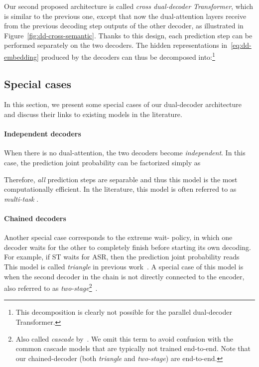 \documentclass[11pt]{article}
\theoremstyle{plain}
\theoremstyle{definition}
\begin{document}
Our second proposed architecture is called \emph{cross dual-decoder Transformer}, which is similar to the previous one, except that now the dual-attention layers receive  from the previous decoding step outputs of the other decoder, as illustrated in Figure~\ref{fig:dd-cross-semantic}. Thanks to this design, each prediction step can be performed separately on the two decoders. The hidden representations  in~\eqref{eq:dd-embedding} produced by the decoders can thus be decomposed into:\footnote{This decomposition is clearly not possible for the parallel dual-decoder Transformer.}


\subsection{Special cases}
\label{sec:degenerate-cases}

In this section, we present some special cases of our dual-decoder architecture and discuss their links to existing models in the literature.

\paragraph{Independent decoders}
When there is no dual-attention, the two decoders become \emph{independent}. In this case, the prediction joint probability can be factorized simply as

Therefore, \emph{all} prediction steps are separable and thus this model is the most computationally efficient. In the literature, this model is often referred to as \emph{multi-task} \cite{anastasopoulos2018tied,sperber2020consistent}.

\paragraph{Chained decoders}
Another special case corresponds to the extreme wait- policy, in which one decoder waits for the other to completely finish before starting its own decoding. For example, if ST waits for ASR, then the prediction joint probability reads  
This model is called \emph{triangle} in previous work~\cite{anastasopoulos2018tied,sperber2020consistent}. A special case of this model is when the second decoder in the chain is not directly connected to the encoder, also referred to as \emph{two-stage}\footnote{
Also called \emph{cascade} by~. We omit this term to avoid confusion with the common cascade models that are typically not trained end-to-end. Note that our chained-decoder (both \emph{triangle} and \emph{two-stage}) are end-to-end.}~\cite{sperber2019attention,sperber2020consistent}.
\end{document}
